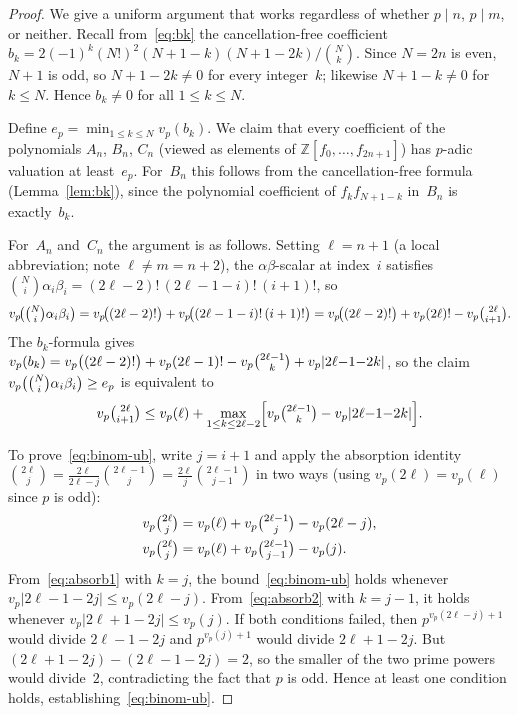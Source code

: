 \documentclass[10pt]{amsart}
\theoremstyle{definition}
\theoremstyle{remark}
\newcommand{\BZ}{\mathbb{Z}}
\begin{document}
\begin{proof}
We give a uniform argument that works regardless of whether $p \mid n$,
$p \mid m$, or neither.
Recall from~\eqref{eq:bk} the cancellation-free coefficient
$b_k = 2(-1)^k(N!)^2(N+1-k)(N+1-2k)/\binom{N}{k}$.
Since $N = 2n$ is even, $N+1$ is odd, so $N+1-2k \ne 0$ for every
integer~$k$; likewise $N+1-k \ne 0$ for $k \le N$.  Hence $b_k \ne 0$
for all $1 \le k \le N$.

Define $e_p = \min_{1 \le k \le N} v_p(b_k)$.  We claim that every
coefficient of the polynomials $A_n$, $B_n$, $C_n$ (viewed as
elements of $\BZ[f_0,\dots,f_{2n+1}]$) has $p$-adic valuation at
least~$e_p$.  For~$B_n$ this follows from the cancellation-free
formula (Lemma~\ref{lem:bk}), since the polynomial coefficient of
$f_k f_{N+1-k}$ in~$B_n$ is exactly~$b_k$.

For~$A_n$ and~$C_n$ the argument is as follows.
Setting $\ell = n+1$ (a local abbreviation; note $\ell \ne m = n+2$),
the $\alpha\beta$-scalar at index~$i$ satisfies
$\binom{N}{i}\alpha_i\beta_i = (2\ell-2)!\,(2\ell-1-i)!\,(i+1)!$, so
\[
v_p\!\bigl(\tbinom{N}{i}\alpha_i\beta_i\bigr)
= v_p\!\bigl((2\ell-2)!\bigr)
  + v_p\!\bigl((2\ell-1-i)!\,(i+1)!\bigr)
= v_p\!\bigl((2\ell-2)!\bigr)
  + v_p(2\ell)! - v_p\tbinom{2\ell}{i+1}.
\]
The $b_k$-formula gives $v_p(b_k) = v_p\bigl((2\ell-2)!\bigr) + v_p(2\ell-1)!
- v_p\tbinom{2\ell-1}{k} + v_p\lvert 2\ell{-}1{-}2k\rvert$, so the claim
$v_p\bigl(\tbinom{N}{i}\alpha_i\beta_i\bigr) \ge e_p$ is equivalent to
\begin{equation}\label{eq:binom-ub}
v_p\tbinom{2\ell}{i+1}
\le v_p(\ell)
  + \max_{1 \le k \le 2\ell-2}
    \Bigl[v_p\tbinom{2\ell-1}{k} - v_p\lvert 2\ell{-}1{-}2k\rvert\Bigr].
\end{equation}

To prove~\eqref{eq:binom-ub}, write $j = i+1$ and apply the
absorption identity $\binom{2\ell}{j} = \frac{2\ell}{2\ell-j}\binom{2\ell-1}{j}
= \frac{2\ell}{j}\binom{2\ell-1}{j-1}$ in two ways (using $v_p(2\ell) = v_p(\ell)$
since $p$ is odd):
\begin{align}
v_p\tbinom{2\ell}{j} &= v_p(\ell) + v_p\tbinom{2\ell-1}{j} - v_p(2\ell-j),
  \label{eq:absorb1}\\
v_p\tbinom{2\ell}{j} &= v_p(\ell) + v_p\tbinom{2\ell-1}{j-1} - v_p(j).
  \label{eq:absorb2}
\end{align}
From~\eqref{eq:absorb1} with $k=j$, the bound~\eqref{eq:binom-ub}
holds whenever $v_p\lvert 2\ell{-}1{-}2j\rvert \le v_p(2\ell-j)$.
From~\eqref{eq:absorb2} with $k=j-1$, it holds whenever
$v_p\lvert 2\ell{+}1{-}2j\rvert \le v_p(j)$.
If both conditions failed, then $p^{v_p(2\ell-j)+1}$ would divide
$2\ell{-}1{-}2j$ and $p^{v_p(j)+1}$ would divide $2\ell{+}1{-}2j$.
But $(2\ell{+}1{-}2j)-(2\ell{-}1{-}2j)=2$, so the smaller of the two
prime powers would divide~$2$, contradicting the fact that $p$ is odd.
Hence at least one condition holds, establishing~\eqref{eq:binom-ub}.


\end{proof}
\end{document}
